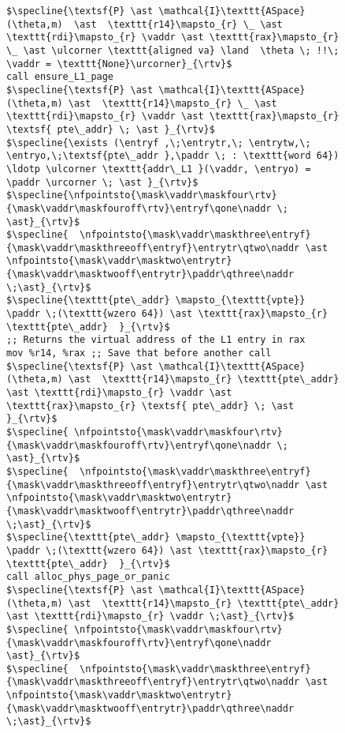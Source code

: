 \begin{figure}\footnotesize
  \begin{lstlisting}
$\specline{\textsf{P} \ast \mathcal{I}\texttt{ASpace}(\theta,m)  \ast  \texttt{r14}\mapsto_{r} \_ \ast \texttt{rdi}\mapsto_{r} \vaddr \ast \texttt{rax}\mapsto_{r} \_ \ast \ulcorner \texttt{aligned va} \land  \theta \; !!\; \vaddr = \texttt{None}\urcorner}_{\rtv}$
call ensure_L1_page
$\specline{\textsf{P} \ast \mathcal{I}\texttt{ASpace}(\theta,m) \ast  \texttt{r14}\mapsto_{r} \_ \ast \texttt{rdi}\mapsto_{r} \vaddr \ast \texttt{rax}\mapsto_{r} \textsf{ pte\_addr} \; \ast }_{\rtv}$
$\specline{\exists (\entryf ,\;\entrytr,\; \entrytw,\; \entryo,\;\textsf{pte\_addr },\paddr \; : \texttt{word 64}) \ldotp \ulcorner \texttt{addr\_L1 }(\vaddr, \entryo) = \paddr \urcorner \; \ast }_{\rtv}$
$\specline{\nfpointsto{\mask\vaddr\maskfour\rtv}{\mask\vaddr\maskfouroff\rtv}\entryf\qone\naddr \; \ast}_{\rtv}$ 
$\specline{  \nfpointsto{\mask\vaddr\maskthree\entryf}{\mask\vaddr\maskthreeoff\entryf}\entrytr\qtwo\naddr \ast \nfpointsto{\mask\vaddr\masktwo\entrytr}{\mask\vaddr\masktwooff\entrytr}\paddr\qthree\naddr \;\ast}_{\rtv}$
$\specline{\texttt{pte\_addr} \mapsto_{\texttt{vpte}} \paddr \;(\texttt{wzero 64}) \ast \texttt{rax}\mapsto_{r} \texttt{pte\_addr}  }_{\rtv}$
;; Returns the virtual address of the L1 entry in rax
mov %r14, %rax ;; Save that before another call
$\specline{\textsf{P} \ast \mathcal{I}\texttt{ASpace}(\theta,m) \ast  \texttt{r14}\mapsto_{r} \texttt{pte\_addr} \ast \texttt{rdi}\mapsto_{r} \vaddr \ast \texttt{rax}\mapsto_{r} \textsf{ pte\_addr} \; \ast }_{\rtv}$
$\specline{ \nfpointsto{\mask\vaddr\maskfour\rtv}{\mask\vaddr\maskfouroff\rtv}\entryf\qone\naddr \; \ast}_{\rtv}$ 
$\specline{  \nfpointsto{\mask\vaddr\maskthree\entryf}{\mask\vaddr\maskthreeoff\entryf}\entrytr\qtwo\naddr \ast \nfpointsto{\mask\vaddr\masktwo\entrytr}{\mask\vaddr\masktwooff\entrytr}\paddr\qthree\naddr \;\ast}_{\rtv}$
$\specline{\texttt{pte\_addr} \mapsto_{\texttt{vpte}} \paddr \;(\texttt{wzero 64}) \ast \texttt{rax}\mapsto_{r} \texttt{pte\_addr}  }_{\rtv}$
call alloc_phys_page_or_panic
$\specline{\textsf{P} \ast \mathcal{I}\texttt{ASpace}(\theta,m) \ast  \texttt{r14}\mapsto_{r} \texttt{pte\_addr} \ast \texttt{rdi}\mapsto_{r} \vaddr \;\ast}_{\rtv}$
$\specline{ \nfpointsto{\mask\vaddr\maskfour\rtv}{\mask\vaddr\maskfouroff\rtv}\entryf\qone\naddr \ast}_{\rtv}$ 
$\specline{  \nfpointsto{\mask\vaddr\maskthree\entryf}{\mask\vaddr\maskthreeoff\entryf}\entrytr\qtwo\naddr \ast \nfpointsto{\mask\vaddr\masktwo\entrytr}{\mask\vaddr\masktwooff\entrytr}\paddr\qthree\naddr \;\ast}_{\rtv}$

\end{lstlisting}
\end{figure}
